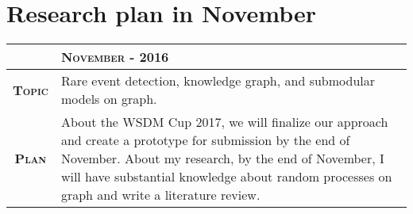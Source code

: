 \documentclass[12pt,twoside]{article}
\begin{document}
\section{Research plan in November}

\begin{center}
  \renewcommand{\arraystretch}{1.5}
  \begin{longtable}{| c | p{12cm} |}
  \hline
  & \textbf{\textsc{November - 2016}} \\ \hline
  \textbf{\textsc{Topic}} & Rare event detection, knowledge graph,
  and submodular models on graph.\\ \hline
  \textbf{\textsc{Plan}} & About the WSDM Cup 2017, we will finalize our approach
  and create a prototype for submission by the end of November. About my research,
  by the end of November, I will have substantial knowledge about random processes
  on graph and write a literature review.
  \\ \hline
  \end{longtable}
\end{center}
\end{document}
